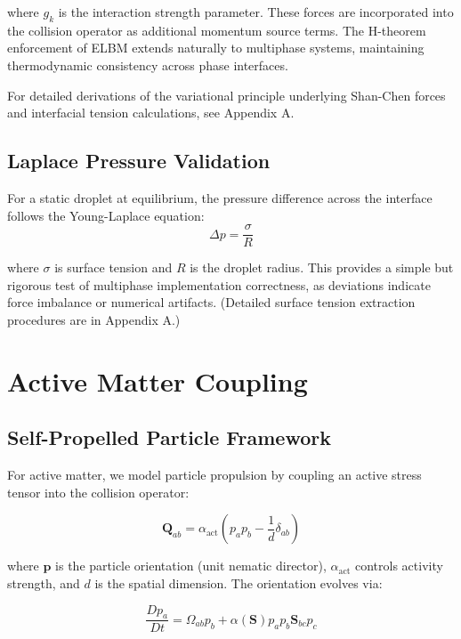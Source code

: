 where $g_k$ is the interaction strength parameter. These forces are incorporated into the collision operator as additional momentum source terms. The H-theorem enforcement of ELBM extends naturally to multiphase systems, maintaining thermodynamic consistency across phase interfaces.

For detailed derivations of the variational principle underlying Shan-Chen forces and interfacial tension calculations, see Appendix A.

\subsection{Laplace Pressure Validation}

For a static droplet at equilibrium, the pressure difference across the interface follows the Young-Laplace equation:
\begin{equation}
\Delta p = \frac{\sigma}{R}
\end{equation}

where $\sigma$ is surface tension and $R$ is the droplet radius. This provides a simple but rigorous test of multiphase implementation correctness, as deviations indicate force imbalance or numerical artifacts. (Detailed surface tension extraction procedures are in Appendix A.)

\section{Active Matter Coupling}

\subsection{Self-Propelled Particle Framework}

For active matter, we model particle propulsion by coupling an active stress tensor into the collision operator:

\begin{equation}
\mathbf{Q}_{ab} = \alpha_{\text{act}}(p_a p_b - \frac{1}{d}\delta_{ab})
\end{equation}

where $\mathbf{p}$ is the particle orientation (unit nematic director), $\alpha_{\text{act}}$ controls activity strength, and $d$ is the spatial dimension. The orientation evolves via:

\begin{equation}
\frac{Dp_a}{Dt} = \Omega_{ab} p_b + \alpha(\mathbf{S}) p_a p_b \mathbf{S}_{bc} p_c
\end{equation}

